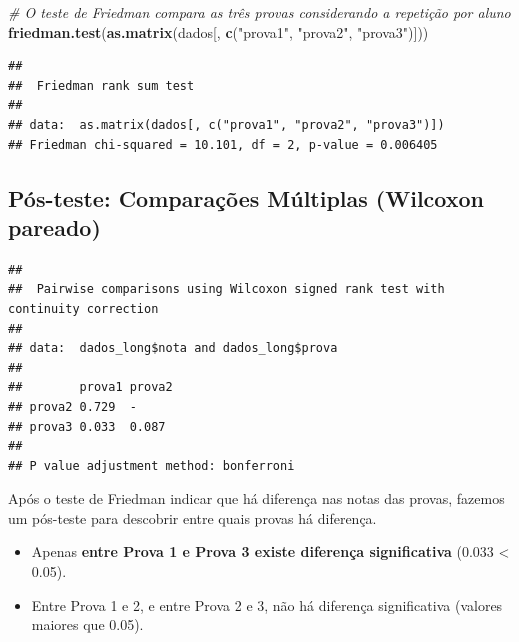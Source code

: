 \documentclass[
]{book}
\newenvironment{Shaded}{\begin{snugshade}}{\end{snugshade}}
\newcommand{\AttributeTok}[1]{\textcolor[rgb]{0.13,0.29,0.53}{#1}}
\newcommand{\CommentTok}[1]{\textcolor[rgb]{0.56,0.35,0.01}{\textit{#1}}}
\newcommand{\ConstantTok}[1]{\textcolor[rgb]{0.56,0.35,0.01}{#1}}
\newcommand{\FunctionTok}[1]{\textcolor[rgb]{0.13,0.29,0.53}{\textbf{#1}}}
\newcommand{\NormalTok}[1]{#1}
\newcommand{\SpecialCharTok}[1]{\textcolor[rgb]{0.81,0.36,0.00}{\textbf{#1}}}
\newcommand{\StringTok}[1]{\textcolor[rgb]{0.31,0.60,0.02}{#1}}
\providecommand{\tightlist}{%
  \setlength{\itemsep}{0pt}\setlength{\parskip}{0pt}}
\begin{document}
\begin{Shaded}
\begin{Highlighting}[]
\CommentTok{\# O teste de Friedman compara as três provas considerando a repetição por aluno}
\FunctionTok{friedman.test}\NormalTok{(}\FunctionTok{as.matrix}\NormalTok{(dados[, }\FunctionTok{c}\NormalTok{(}\StringTok{"prova1"}\NormalTok{, }\StringTok{"prova2"}\NormalTok{, }\StringTok{"prova3"}\NormalTok{)]))}
\end{Highlighting}
\end{Shaded}

\begin{verbatim}
## 
##  Friedman rank sum test
## 
## data:  as.matrix(dados[, c("prova1", "prova2", "prova3")])
## Friedman chi-squared = 10.101, df = 2, p-value = 0.006405
\end{verbatim}

\subsection{Pós-teste: Comparações Múltiplas (Wilcoxon pareado)}\label{puxf3s-teste-comparauxe7uxf5es-muxfaltiplas-wilcoxon-pareado}

\begin{Shaded}
\end{Shaded}

\begin{verbatim}
## 
##  Pairwise comparisons using Wilcoxon signed rank test with continuity correction 
## 
## data:  dados_long$nota and dados_long$prova 
## 
##        prova1 prova2
## prova2 0.729  -     
## prova3 0.033  0.087 
## 
## P value adjustment method: bonferroni
\end{verbatim}

Após o teste de Friedman indicar que há diferença nas notas das provas, fazemos um pós-teste para descobrir entre quais provas há diferença.

\begin{itemize}
\tightlist
\item
  Apenas \textbf{entre Prova 1 e Prova 3 existe diferença significativa} (0.033 \textless{} 0.05).
\item
  Entre Prova 1 e 2, e entre Prova 2 e 3, não há diferença significativa (valores maiores que 0.05).
\end{itemize}
\end{document}
